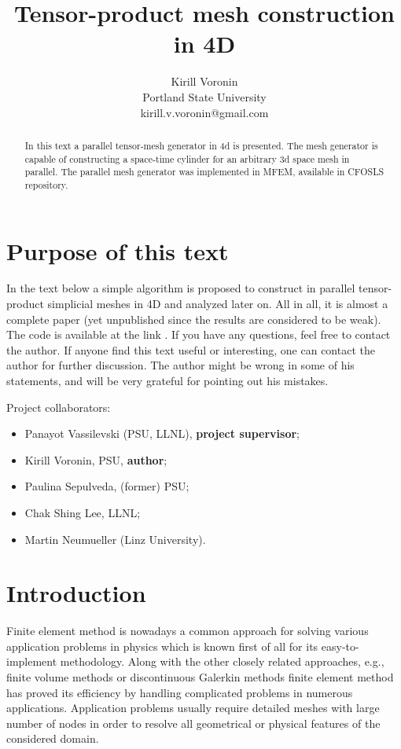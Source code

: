 \documentclass[12pt]{article}
\title{Tensor-product mesh construction in 4D}
\author{Kirill Voronin \\
Portland State University \\
kirill.v.voronin@gmail.com}
\date{}
\begin{document}
\maketitle

\begin{abstract}
In this text a parallel tensor-mesh generator in 4d is presented. The mesh generator is capable of constructing a space-time cylinder for an arbitrary 3d space mesh in parallel.
The parallel mesh generator was implemented in MFEM, available in CFOSLS repository.
\end{abstract}

\section*{Purpose of this text}
In the text below a simple algorithm is proposed to construct in parallel tensor-product simplicial meshes in 4D and analyzed later on. All in all, it is almost a complete paper (yet unpublished since the results are considered to be weak).
The code is available at the link \cite{cfosls_code}. If you have any questions, feel free to contact the author.
If anyone find this text useful or interesting, one can contact the author for further discussion. The author might be wrong in some of his statements, and will be very grateful for pointing out his mistakes.

Project collaborators:
\begin{itemize}
	\item Panayot Vassilevski (PSU, LLNL), \textbf{project supervisor};
	\item Kirill Voronin, PSU, \textbf{author};
	\item Paulina Sepulveda, (former) PSU;
	\item Chak Shing Lee, LLNL;
	\item Martin Neumueller (Linz University).
\end{itemize}

\section*{Introduction}

Finite element method is nowadays a common approach for solving various application problems in physics which is known first of all for its easy-to-implement methodology. Along with the other closely related approaches, e.g., finite volume methods or discontinuous Galerkin methods finite element method has proved its efficiency by handling complicated problems in numerous applications. Application problems usually require detailed meshes with large number of nodes in order to resolve all geometrical or physical features of the considered domain.
\end{document}
